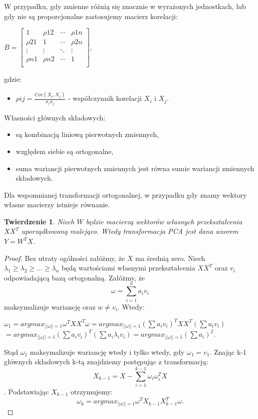 \documentclass[12pt,a4paper]{report}
\newtheorem{tw}[df]{Twierdzenie}
\begin{document}
W przypadku, gdy zmienne różnią się znacznie w wyrażonych jednostkach, lub gdy nie są proporcjonalne zastosujemy macierz korelacji:
\begin{center}
$ B= \left[
        \begin{array}{cccc}
         1 & \rho{12} & \cdots & \rho{1n} \\
         \rho{21} & 1 & \cdots & \rho{2n} \\
         \vdots & \vdots & \ddots & \vdots \\ 
         \rho{n1} & \rho{n2} & \cdots & 1 \\ 
         \end{array}
      \right]$, 
\end{center}
gdzie:
\begin{itemize}
\item $\rho{ij}=\frac{Cov(X_i,X_j)}{\sigma_{i}\sigma_{j}}$ - współczynnik korelacji $X_i$ i $X_j$.
\end{itemize}
\bigskip
\bigskip
Własności głównych składowych:
\begin{itemize}
\item są kombinacją liniową pierwotnych zmiennych,
\item względem siebie są ortogonalne,
\item suma wariancji pierwotnych zmiennych jest równa sumie wariancji zmiennych składowych.
\end{itemize}
\bigskip
\bigskip
Dla wspomnianej transformacji ortogonalnej, w przypadku gdy znamy wektory własne macierzy istnieje równanie.
\begin{tw}
Niech $W$ będzie macierzą wektorów własnych przekształcenia $XX^T$ uporządkowaną malejąco.
Wtedy transformacja PCA jest dana wzorem $Y=W^T X$.
\end{tw}
\begin{proof}
Bez utraty ogólności załóżmy, że $X$ ma średnią zero.
Niech $\lambda_1\geq\lambda_2\geq...\geq\lambda_n$ będą wartościami własnymi przekształcenia $XX^T$ oraz $v_i$ odpowiadającą bazą ortogonalną. Załóżmy, że $$\omega = \sum_{i=1}^n a_iv_i$$ maksymalizuje wariancję oraz $w\neq v_i$.
Wtedy:
\begin{center}
$\omega_1 = argmax_{||\omega||=1}\omega^TXX^T\omega = argmax_{||\omega||=1}(\sum a_iv_i)^TXX^T(\sum a_iv_i)$
$ = argmax_{||\omega||=1}(\sum a_iv_i)^T(\sum a_i\lambda_iv_i)= argmax_{||\omega||=1}(\sum a_i)^2$.
\end{center}
Stąd $\omega_1$ maksymalizuje wariancję wtedy i tylko wtedy, gdy $\omega_1=v_1$. 
Znając k-1 głównych składowych k-tą znajdziemy postępując z transformacją:
$$X_{k-1} = X - \sum_{i=1}^{k-1}\omega_i\omega_i^TX$$.
Podstawiając $X_{k-1}$ otrzymujemy:
$$\omega_k = argmax_{||x||=1}\omega^TX_{k-1}X_{k-1}^T\omega.$$
\end{proof}
\end{document}
